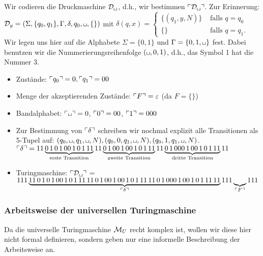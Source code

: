 \begin{Bsp*}
	Wir codieren die Druckmaschine $\D_{\blank}$, d.h., wir bestimmen $\godel{\D_{\blank}}$.
	Zur Erinnerung: \\
	$\mathcal{D}_y=\left(\Sigma,\{q_0,q_1\},\Gamma,\delta,q_0,\blank,\{\}\right)$ mit
  $\delta(q,x)=\begin{cases}\{(q_1, y, N)\} & \text{ falls } q = q_0\\ \{\} & \text{ falls } q = q_1.\end{cases}$
	Wir legen uns hier auf die Alphabete $\Sigma = \{0, 1\}$ und $\Gamma = \{0, 1, \blank\}$ fest.
	Dabei benutzen wir die Nummerierungsreihenfolge $(\blank, 0, 1)$, d.h., das Symbol 1 hat die Nummer 3.
	
	\begin{itemize}
		\item Zustände: $\ulcorner q_0 \urcorner = 0, \ulcorner q_1 \urcorner = 00$
		
		\item Menge der akzeptierenden Zustände: $\ulcorner F \urcorner = \varepsilon$ (da $F = \{\}$)
		
		\item Bandalphabet: $\godel{\blank} = 0$, $\ulcorner 0 \urcorner = 00$, $\ulcorner 1 \urcorner = 000$
		
		\item Zur Bestimmung von $\ulcorner \delta \urcorner$ schreiben wir nochmal explizit alle Transitionen als 5-Tupel auf:
		$(q_0, \blank, q_1, \blank, N), (q_0, 0, q_1, \blank, N), (q_0, 1, q_1, \blank, N)$. \\
		$\ulcorner \delta \urcorner = 11 \underbrace{0\,1\,0\,1\,00\,1\,0\,1\,11}_\text{erste Transition} 11 \underbrace{0\,1\,00\,1\,00\,1\,0\,1\,11}_\text{zweite Transition} 11 \underbrace{0\,1\,000\,1\,00\,1\,0\,1\,11}_\text{dritte Transition} 11$
		
		\item Turingmaschine: $\godel{\D_{\blank}}$ = \\ $111\underbrace{11\,0\,1\,0\,1\,00\,1\,0\,1\,11\,11\,0\,1\,00\,1\,00\,1\,0\,1\,11\,11\,0\,1\,000\,1\,00\,1\,0\,1\,11\,11}_{\ulcorner \delta \urcorner}111\underbrace{\,}_{\ulcorner F \urcorner}111$
		\qedhere
	\end{itemize}
\end{Bsp*}



\subsubsection{Arbeitsweise der universellen Turingmaschine}
Da die universelle Turingmaschine $\mathcal{M}_U$ recht komplex ist, wollen wir diese hier nicht formal definieren, sondern geben nur eine informelle Beschreibung der Arbeitsweise an.


